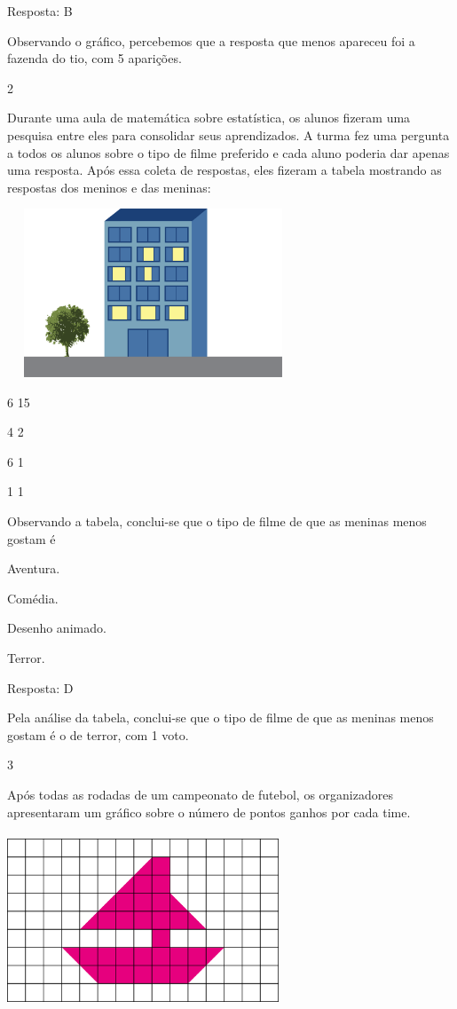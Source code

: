 \begin{multicols}{2}
\begin{enumerate}
{Resposta: B

Observando o gráfico, percebemos que a resposta que menos apareceu foi a
fazenda do tio, com 5 aparições.

\num{2}

Durante uma aula de matemática sobre estatística, os alunos fizeram uma
pesquisa entre eles para consolidar seus aprendizados. A turma fez uma
pergunta a todos os alunos sobre o tipo de filme preferido e cada aluno
poderia dar apenas uma resposta. Após essa coleta de respostas, eles
fizeram a tabela mostrando as respostas dos meninos e das
meninas:

\includegraphics[width=3.42308in,height=1.97646in]{media/image93.png}


6 15

4 2

6 1

1 1

Observando a tabela, conclui-se que o tipo de filme de que as meninas menos
gostam é

\begin{escolha}

\item
  Aventura.
\item
  Comédia.
\item
  Desenho animado.
\item
  Terror.
\end{escolha}

Resposta: D

Pela análise da tabela, conclui-se que o tipo de filme de que as meninas menos gostam é o de terror, com 1 voto.

\num{3}

Após todas as rodadas de um campeonato de futebol, os organizadores
apresentaram um gráfico sobre o número de pontos ganhos por cada
time.

\includegraphics[width=3.19194in,height=2.04184in]{media/image94.png}

}
\end{enumerate}
\end{multicols}
